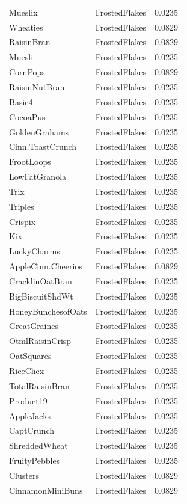 \begin{longtable}{llr}
Mueslix & FrostedFlakes & 0.0235 \\
Wheaties & FrostedFlakes & 0.0829 \\
RaisinBran & FrostedFlakes & 0.0829 \\
Muesli & FrostedFlakes & 0.0235 \\
CornPops & FrostedFlakes & 0.0829 \\
RaisinNutBran & FrostedFlakes & 0.0235 \\
Basic4 & FrostedFlakes & 0.0235 \\
CocoaPus & FrostedFlakes & 0.0235 \\
GoldenGrahams & FrostedFlakes & 0.0235 \\
Cinn.ToastCrunch & FrostedFlakes & 0.0235 \\
FrootLoops & FrostedFlakes & 0.0235 \\
LowFatGranola & FrostedFlakes & 0.0235 \\
Trix & FrostedFlakes & 0.0235 \\
Triples & FrostedFlakes & 0.0235 \\
Crispix & FrostedFlakes & 0.0235 \\
Kix & FrostedFlakes & 0.0235 \\
LuckyCharms & FrostedFlakes & 0.0235 \\
AppleCinn.Cheerios & FrostedFlakes & 0.0829 \\
CracklinOatBran & FrostedFlakes & 0.0235 \\
BigBiscuitShdWt & FrostedFlakes & 0.0235 \\
HoneyBunchesofOats & FrostedFlakes & 0.0235 \\
GreatGraines & FrostedFlakes & 0.0235 \\
OtmlRaisinCrisp & FrostedFlakes & 0.0235 \\
OatSquares & FrostedFlakes & 0.0235 \\
RiceChex & FrostedFlakes & 0.0235 \\
TotalRaisinBran & FrostedFlakes & 0.0235 \\
Product19 & FrostedFlakes & 0.0235 \\
AppleJacks & FrostedFlakes & 0.0235 \\
CaptCrunch & FrostedFlakes & 0.0235 \\
ShreddedWheat & FrostedFlakes & 0.0235 \\
FruityPebbles & FrostedFlakes & 0.0235 \\
Clusters & FrostedFlakes & 0.0829 \\
CinnamonMiniBuns & FrostedFlakes & 0.0829 \\

\end{longtable}
